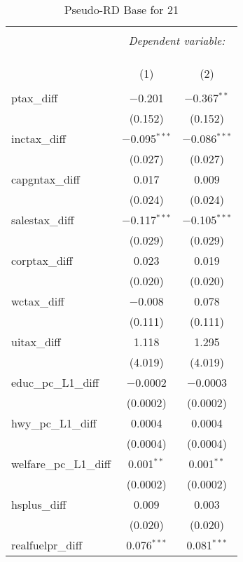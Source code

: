 
\begin{table}[!htbp] \centering 
  \caption{Pseudo-RD Base for  21} 
  \label{} 
\begin{tabular}{@{\extracolsep{5pt}}lcc} 
\\[-1.8ex]\hline 
\hline \\[-1.8ex] 
 & \multicolumn{2}{c}{\textit{Dependent variable:}} \\ 
\cline{2-3} 
\\[-1.8ex] & \multicolumn{2}{c}{ } \\ 
\\[-1.8ex] & (1) & (2)\\ 
\hline \\[-1.8ex] 
 ptax\_diff & $-$0.201 & $-$0.367$^{**}$ \\ 
  & (0.152) & (0.152) \\ 
  inctax\_diff & $-$0.095$^{***}$ & $-$0.086$^{***}$ \\ 
  & (0.027) & (0.027) \\ 
  capgntax\_diff & 0.017 & 0.009 \\ 
  & (0.024) & (0.024) \\ 
  salestax\_diff & $-$0.117$^{***}$ & $-$0.105$^{***}$ \\ 
  & (0.029) & (0.029) \\ 
  corptax\_diff & 0.023 & 0.019 \\ 
  & (0.020) & (0.020) \\ 
  wctax\_diff & $-$0.008 & 0.078 \\ 
  & (0.111) & (0.111) \\ 
  uitax\_diff & 1.118 & 1.295 \\ 
  & (4.019) & (4.019) \\ 
  educ\_pc\_L1\_diff & $-$0.0002 & $-$0.0003 \\ 
  & (0.0002) & (0.0002) \\ 
  hwy\_pc\_L1\_diff & 0.0004 & 0.0004 \\ 
  & (0.0004) & (0.0004) \\ 
  welfare\_pc\_L1\_diff & 0.001$^{**}$ & 0.001$^{**}$ \\ 
  & (0.0002) & (0.0002) \\ 
  hsplus\_diff & 0.009 & 0.003 \\ 
  & (0.020) & (0.020) \\ 
  realfuelpr\_diff & 0.076$^{***}$ & 0.081$^{***}$ \\ 

\end{tabular}
\end{table}
